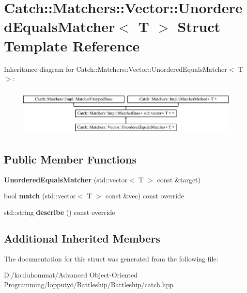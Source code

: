 \hypertarget{struct_catch_1_1_matchers_1_1_vector_1_1_unordered_equals_matcher}{}\section{Catch\+:\+:Matchers\+:\+:Vector\+:\+:Unordered\+Equals\+Matcher$<$ T $>$ Struct Template Reference}
\label{struct_catch_1_1_matchers_1_1_vector_1_1_unordered_equals_matcher}
Inheritance diagram for Catch\+:\+:Matchers\+:\+:Vector\+:\+:Unordered\+Equals\+Matcher$<$ T $>$\+:\begin{figure}[H]
\begin{center}
\leavevmode
\includegraphics[height=2.492581cm]{struct_catch_1_1_matchers_1_1_vector_1_1_unordered_equals_matcher}
\end{center}
\end{figure}
\subsection*{Public Member Functions}
\begin{DoxyCompactItemize}
\item 
\mbox{\label{struct_catch_1_1_matchers_1_1_vector_1_1_unordered_equals_matcher_a525905639b2b15b52ddb0bf14bfa19da}} 
{\bfseries Unordered\+Equals\+Matcher} (std\+::vector$<$ T $>$ const \&target)
\item 
\mbox{\label{struct_catch_1_1_matchers_1_1_vector_1_1_unordered_equals_matcher_a3ccdd9dd2cd8bdbb8bb121acbb9cb358}} 
bool {\bfseries match} (std\+::vector$<$ T $>$ const \&vec) const override
\item 
\mbox{\label{struct_catch_1_1_matchers_1_1_vector_1_1_unordered_equals_matcher_a7202d811200317abc58c844f663823df}} 
std\+::string {\bfseries describe} () const override
\end{DoxyCompactItemize}
\subsection*{Additional Inherited Members}


The documentation for this struct was generated from the following file\+:\begin{DoxyCompactItemize}
\item 
D\+:/kouluhommat/\+Advanced Object-\/\+Oriented Programming/lopputyö/\+Battleship/\+Battleship/catch.\+hpp\end{DoxyCompactItemize}
